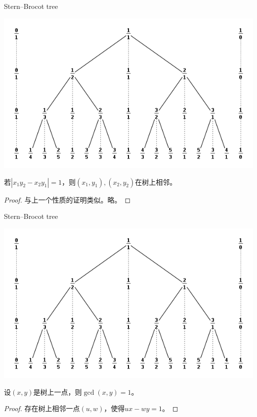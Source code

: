\documentclass{ctexbeamer}        %
\begin{document}
\begin{frame}{Stern–Brocot tree}

\begin{theorem}
	\includegraphics[scale=0.3]{figure2.png}

    若$|x_1y_2-x_2y_1|=1$，则$(x_1,y_1),(x_2,y_2)$在树上相邻。
\end{theorem}
\begin{proof}
    与上一个性质的证明类似。略。
\end{proof}
\end{frame}

\begin{frame}{Stern–Brocot tree}

\begin{theorem}
	\includegraphics[scale=0.3]{figure2.png}

    设$(x,y)$是树上一点，则$\gcd(x,y)=1$。
\end{theorem}
\begin{proof}
    存在树上相邻一点$(u,w)$，使得$ux-wy=1$。
\end{proof}
\end{frame}
\end{document}
